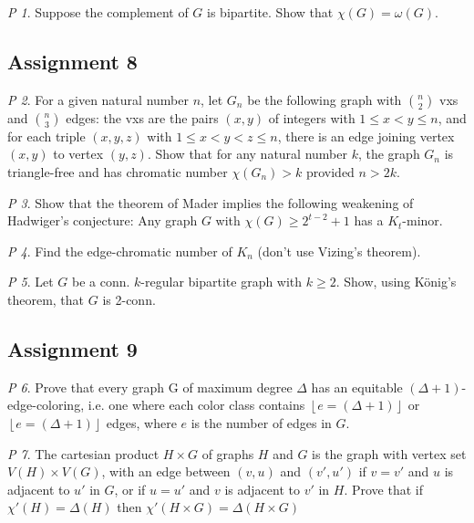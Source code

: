 \documentclass[11pt, fleqn, a4paper, landscape]{article}
\theoremstyle{plain} %
\theoremstyle{remark} %
\newtheorem{problem}{P}
\theoremstyle{definition} %
\begin{document}
\begin{multicols}{5}
\begin{problem}
Suppose the complement of $G$ is bipartite. Show that $\chi(G) = \omega(G).$
\end{problem}

\subsection{Assignment 8}

\begin{problem}
For a given natural number $n$, let $G_n$ be the following graph with $\binom{n}{2}$ vxs and $\binom{n}{3}$ edges: the vxs are the pairs $(x, y)$ of integers with $1\le x < y \le n$, and for each triple $(x, y, z)$ with $1\le x < y < z\le n$, there is an edge joining vertex $(x, y)$ to vertex $(y, z)$. Show that for any natural number $k$, the graph $G_n$ is triangle-free and has chromatic number $\chi(G_n) > k$ provided $n > 2k$.
\end{problem}

\begin{problem}
Show that the theorem of Mader implies the following weakening of Hadwiger's
conjecture: Any graph $G$ with $\chi(G) \ge 2^{t-2} + 1$ has a $K_t$-minor.
\end{problem}

\begin{problem}
Find the edge-chromatic number of $K_n$ (don't use Vizing's theorem).
\end{problem}

\begin{problem}
Let $G$ be a conn. $k$-regular bipartite graph with $k\ge 2$. Show, using König's theorem, that $G$ is 2-conn.
\end{problem}

\subsection{Assignment 9}

\begin{problem}
Prove that every graph G of maximum degree $\Delta$ has an equitable $(\Delta + 1)$-edge-coloring, i.e. one where each color class contains $\left\lfloor e=(\Delta + 1)\right\rfloor$ or $\left\lfloor e=(\Delta + 1)\right\rfloor$ edges, where $e$ is the number of edges in $G$.
\end{problem}

\begin{problem}
The cartesian product $H \times G $ of graphs $H$ and $G$ is the graph with vertex set $V (H)\times V (G)$, with an edge between $(v, u)$ and $(v', u')$ if $v = v'$ and $u$ is adjacent to $u'$ in $G$, or
if $u = u'$ and $v$ is adjacent to $v'$ in $H$. Prove that if $\chi'(H) = \Delta(H)$ then $\chi'(H\times G) = \Delta(H\times G)$
\end{problem}


\end{multicols}
\end{document}
